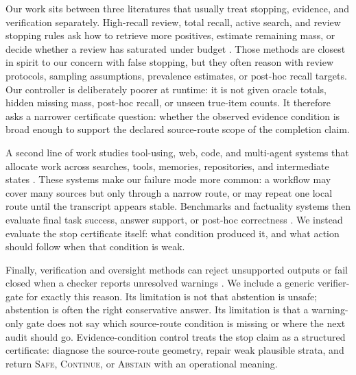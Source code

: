 \documentclass[letterpaper,10pt,twocolumn]{article}
\newcommand{\safe}{\textsc{Safe}}
\newcommand{\cont}{\textsc{Continue}}
\newcommand{\abstain}{\textsc{Abstain}}
\begin{document}
Our work sits between three literatures that usually treat stopping, evidence,
and verification separately. High-recall review, total recall, active search, and
review stopping rules ask how to retrieve more positives, estimate remaining
mass, or decide whether a review has saturated under budget
\citep{grossman2011technology,cormack2014evaluation,cormack2015multi,
cormack2016engineering,grossman2016trec,roegiest2015trec,voorhees2002overview,
wallace2010active,lewis1994sequential,settles2009active,garnett2012bayesian,
attenberg2011beat,good1953population,chao1984nonparametric,chao2014species}.
Those methods are closest in spirit to our concern with false stopping, but they
often reason with review protocols, sampling assumptions, prevalence estimates,
or post-hoc recall targets. Our controller is deliberately poorer at runtime: it
is not given oracle totals, hidden missing mass, post-hoc recall, or unseen
true-item counts. It therefore asks a narrower certificate question: whether the
observed evidence condition is broad enough to support the declared source-route
scope of the completion claim.

A second line of work studies tool-using, web, code, and multi-agent systems that
allocate work across searches, tools, memories, repositories, and intermediate
states \citep{yao2023react,schick2023toolformer,nakano2021webgpt,
qin2024toolllm,wu2023autogen,park2023generative,wang2024voyager,
deng2024mind2web,zhou2024webarena,liu2024agentbench,yao2022alfworld,
jimenez2024swebench,shinn2024reflexion,madaan2023selfrefine}. These systems make
our failure mode more common: a workflow may cover many sources but only through a
narrow route, or may repeat one local route until the transcript appears stable.
Benchmarks and factuality systems then evaluate final task success, answer
support, or post-hoc correctness \citep{hendrycks2021measuring,
liang2022holistic,srivastava2023beyond,lin2022truthfulqa,thorne2018fever,
gao2023rarr,min2023factscore,schuster2021get,gehrmann2023repair}. We instead
evaluate the stop certificate itself: what condition produced it, and what action
should follow when that condition is weak.

Finally, verification and oversight methods can reject unsupported outputs or
fail closed when a checker reports unresolved warnings
\citep{dietterich2000ensemble,cobbe2021training,wang2023selfconsistency,
amodei2016concrete,christiano2017deep,irving2018ai,leike2018scalable,
hendrycks2021unsolved}. We include a generic verifier-gate for exactly this
reason. Its limitation is not that abstention is unsafe; abstention is often the
right conservative answer. Its limitation is that a warning-only gate does not say
which source-route condition is missing or where the next audit should go.
Evidence-condition control treats the stop claim as a structured certificate:
diagnose the source-route geometry, repair weak plausible strata, and return
\safe{}, \cont{}, or \abstain{} with an operational meaning.
\end{document}

